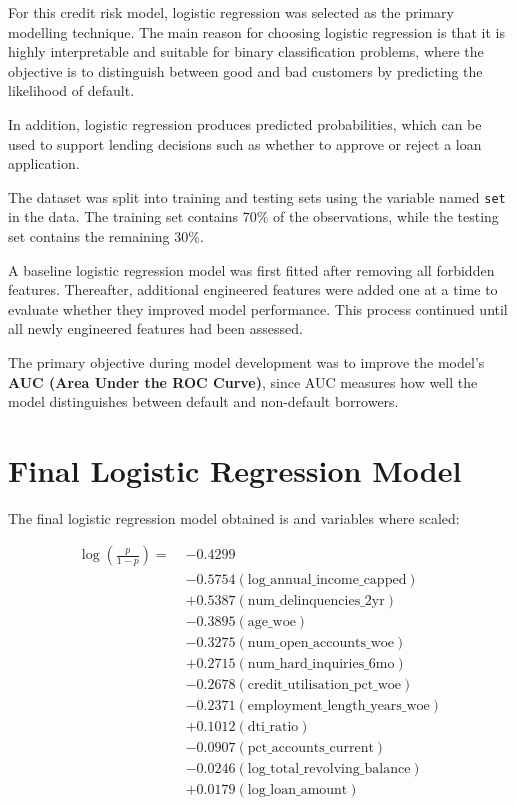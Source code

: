 \documentclass[
  letterpaper,
  DIV=11,
  numbers=noendperiod]{scrartcl}
\begin{document}
For this credit risk model, logistic regression was selected as the
primary modelling technique. The main reason for choosing logistic
regression is that it is highly interpretable and suitable for binary
classification problems, where the objective is to distinguish between
good and bad customers by predicting the likelihood of default.

In addition, logistic regression produces predicted probabilities, which
can be used to support lending decisions such as whether to approve or
reject a loan application.

The dataset was split into training and testing sets using the variable
named \texttt{set} in the data. The training set contains 70\% of the
observations, while the testing set contains the remaining 30\%.

A baseline logistic regression model was first fitted after removing all
forbidden features. Thereafter, additional engineered features were
added one at a time to evaluate whether they improved model performance.
This process continued until all newly engineered features had been
assessed.

The primary objective during model development was to improve the
model's \textbf{AUC (Area Under the ROC Curve)}, since AUC measures how
well the model distinguishes between default and non-default borrowers.

\section{Final Logistic Regression Model}

The final logistic regression model obtained is and variables where
scaled:

\[
\begin{aligned}
\log\left(\frac{p}{1-p}\right) =\;& -0.4299 \\
&-0.5754(\text{log\_annual\_income\_capped}) \\
&+0.5387(\text{num\_delinquencies\_2yr}) \\
&-0.3895(\text{age\_woe}) \\
&-0.3275(\text{num\_open\_accounts\_woe}) \\
&+0.2715(\text{num\_hard\_inquiries\_6mo}) \\
&-0.2678(\text{credit\_utilisation\_pct\_woe}) \\
&-0.2371(\text{employment\_length\_years\_woe}) \\
&+0.1012(\text{dti\_ratio}) \\
&-0.0907(\text{pct\_accounts\_current}) \\
&-0.0246(\text{log\_total\_revolving\_balance})\\
&+0.0179(\text{log\_loan\_amount})
\end{aligned}\]
\end{document}
